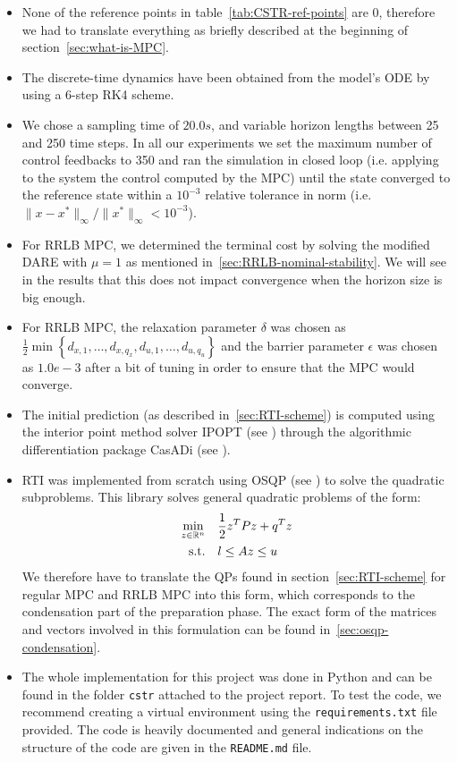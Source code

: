 \documentclass[12pt]{article}
\begin{document}
\begin{itemize}[label=\textbullet]
	\item None of the reference points in table~\ref{tab:CSTR-ref-points} are 0, therefore we had to translate everything as briefly described at the beginning of section~\ref{sec:what-is-MPC}.

	\item The discrete-time dynamics have been obtained from the model's ODE by using a 6-step RK4 scheme.

	\item We chose a sampling time of $20.0s$, and variable horizon lengths between 25 and 250 time steps.
	In all our experiments we set the maximum number of control feedbacks to 350 and ran the simulation in closed loop (i.e. applying to the system the control computed by the MPC) until the state converged to the reference state within a $10^{-3}$ relative tolerance in norm (i.e. $\|x-x^*\|_\infty/\|x^*\|_\infty<10^{-3}$).

	\item For RRLB MPC, we determined the terminal cost by solving the modified DARE with $\mu=1$ as mentioned in~\ref{sec:RRLB-nominal-stability}.
	We will see in the results that this does not impact convergence when the horizon size is big enough.

	\item For RRLB MPC, the relaxation parameter $\delta$ was chosen as $\frac{1}{2}\min\left\{ d_{x,1},\ldots, d_{x,q_x},d_{u,1},\ldots,d_{u,q_u} \right\}$ and the barrier parameter $\epsilon$ was chosen as $1.0e-3$ after a bit of tuning in order to ensure that the MPC would converge.

	\item The initial prediction (as described in~\ref{sec:RTI-scheme}) is computed using the interior point method solver IPOPT (see \cite{ipopt}) through the algorithmic differentiation package CasADi (see \cite{casadi}).

	\item RTI was implemented from scratch using OSQP (see \cite{osqp}) to solve the quadratic subproblems.
	This library solves general quadratic problems of the form:
	\begin{align*}
		\underset{z\in\mathbb{R}^n}{\min}&\quad\frac{1}{2}z^TPz+q^Tz\\
		\text{s.t.}&\quad l\leq Az\leq u
	\end{align*}
	We therefore have to translate the QPs found in section~\ref{sec:RTI-scheme} for regular MPC and RRLB MPC into this form, which corresponds to the condensation part of the preparation phase.
	The exact form of the matrices and vectors involved in this formulation can be found in~\ref{sec:osqp-condensation}.

	\item The whole implementation for this project was done in Python and can be found in the folder \verb|cstr| attached to the project report.
	To test the code, we recommend creating a virtual environment using the \verb|requirements.txt| file provided.
	The code is heavily documented and general indications on the structure of the code are given in the \verb|README.md| file.
\end{itemize}
\end{document}
